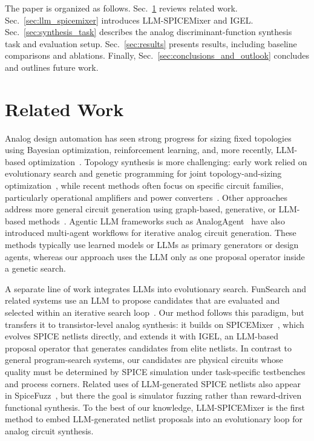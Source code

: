 \documentclass[sigconf,pbalance]{acmart_modified}
\newcommand{\squeezeSection}{}
\newcommand{\llmspm}{LLM-SPICE\-Mixer}
\newcommand{\spm}{SPICE\-Mixer}
\begin{document}
\noindent The paper is organized as follows. Sec.~\ref{sec:related_work} reviews related work. Sec.~\ref{sec:llm_spicemixer} introduces \llmspm{} and IGEL. Sec.~\ref{sec:synthesis_task} describes the analog discriminant-function synthesis task and evaluation setup. Sec.~\ref{sec:results} presents results, including baseline comparisons and ablations. Finally, Sec.~\ref{sec:conclusions_and_outlook} concludes and outlines future work.


\squeezeSection\section{Related Work}
\label{sec:related_work}
Analog design automation has seen strong progress for sizing fixed topologies using Bayesian optimization, reinforcement learning, and, more recently, LLM-based optimization~\cite{lyu2017efficient,gu2024tss,settaluri2020autockt,wang2020gcn,budak2021dnn,kim2025ppaas,somayaji2025llm,liu2025eesizer,ahmadzadeh2025anaflow}. Topology synthesis is more challenging: early work relied on evolutionary search and genetic programming for joint topology-and-sizing optimization~\cite{koza1996automated,hu2005open,rojec2018analog}, while recent methods often focus on specific circuit families, particularly operational amplifiers and power converters~\cite{lu2022topology,zhao2022analog,chen2023total,poddar2024data,shen2025into,fan2021specification,gao2026powergenie}. Other approaches address more general circuit generation using graph-based, generative, or LLM-based methods~\cite{uhlich2024graco,gao2025analoggenie,kim2026analogtobi,vijayaraghavan2025autocircuit,lai2025analogcoder,lai2026analogcoder}. Agentic LLM frameworks such as AnalogAgent~\cite{bao2026analogagent} have also introduced multi-agent workflows for iterative analog circuit generation. These methods typically use learned models or LLMs as primary generators or design agents, whereas our approach uses the LLM only as one proposal operator inside a genetic search.

A separate line of work integrates LLMs into evolutionary search. FunSearch and related systems use an LLM to propose candidates that are evaluated and selected within an iterative search loop~\cite{romera2024funsearch,liu2023ael,liu2024eoh,ye2024reevo,vanstein2024llamea,novikov2025alphaevolve,zhang2026trajectory}. Our method follows this paradigm, but transfers it to transistor-level analog synthesis: it builds on \spm{}~\cite{uhlich2025spicemixer}, which evolves SPICE netlists directly, and extends it with IGEL, an LLM-based proposal operator that generates candidates from elite netlists. In contrast to general program-search systems, our candidates are physical circuits whose quality must be determined by SPICE simulation under task-specific testbenches and process corners. Related uses of LLM-generated SPICE netlists also appear in SpiceFuzz~\cite{ren2026spicefuzz}, but there the goal is simulator fuzzing rather than reward-driven functional synthesis. To the best of our knowledge, \mbox{\llmspm{}} is the first method to embed LLM-generated netlist proposals into an evolutionary loop for analog circuit synthesis.
\end{document}
